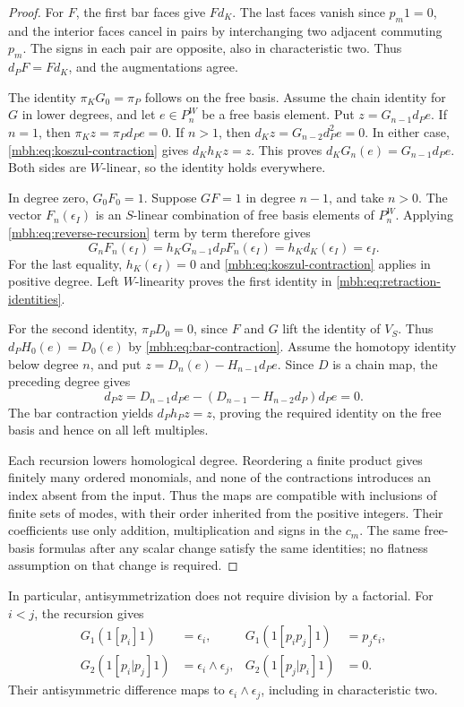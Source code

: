\begin{proof}
For \(F\), the first bar faces give \(Fd_K\).
The last faces vanish since \(p_m1=0\), and the interior faces
cancel in pairs by interchanging two adjacent commuting \(p_m\).
The signs in each pair are opposite, also in characteristic two.
Thus \(d_PF=Fd_K\), and the augmentations agree.

The identity \(\pi_KG_0=\pi_P\) follows on the free basis.
Assume the chain identity for \(G\) in lower degrees, and let
\(e\in P^W_n\) be a free basis element.  Put
\(z=G_{n-1}d_Pe\).  If \(n=1\), then
\(\pi_Kz=\pi_Pd_Pe=0\).  If \(n>1\), then
\(d_Kz=G_{n-2}d_P^2e=0\).  In either case,
\eqref{mbh:eq:koszul-contraction} gives \(d_Kh_Kz=z\).
This proves \(d_KG_n(e)=G_{n-1}d_Pe\).
Both sides are \(W\)-linear, so the identity holds everywhere.

In degree zero, \(G_0F_0=1\).  Suppose \(GF=1\) in degree
\(n-1\), and take \(n>0\).
The vector \(F_n(\epsilon_I)\) is an \(S\)-linear combination
of free basis elements of \(P^W_n\).  Applying
\eqref{mbh:eq:reverse-recursion} term by term therefore gives
\[
 G_nF_n(\epsilon_I)
   =h_KG_{n-1}d_PF_n(\epsilon_I)
   =h_Kd_K(\epsilon_I)=\epsilon_I.
\]
For the last equality, \(h_K(\epsilon_I)=0\) and
\eqref{mbh:eq:koszul-contraction} applies in positive degree.
Left \(W\)-linearity proves the first identity in
\eqref{mbh:eq:retraction-identities}.

For the second identity, \(\pi_PD_0=0\), since \(F\) and \(G\)
lift the identity of \(V_S\).  Thus
\(d_PH_0(e)=D_0(e)\) by \eqref{mbh:eq:bar-contraction}.
Assume the homotopy identity below degree \(n\), and put
\(z=D_n(e)-H_{n-1}d_Pe\).
Since \(D\) is a chain map, the preceding degree gives
\[
 d_Pz
  =D_{n-1}d_Pe
    -(D_{n-1}-H_{n-2}d_P)d_Pe=0.
\]
The bar contraction yields \(d_Ph_Pz=z\), proving the required
identity on the free basis and hence on all left multiples.

Each recursion lowers homological degree.  Reordering a finite
product gives finitely many ordered monomials, and none of the
contractions introduces an index absent from the input.  Thus the
maps are compatible with inclusions of finite sets of modes, with
their order inherited from the positive integers.
Their coefficients use only addition, multiplication and signs in
the \(c_m\).  The same free-basis formulas after any scalar change
satisfy the same identities; no flatness assumption on that change
is required.
\end{proof}

In particular, antisymmetrization does not require division by a
factorial.  For \(i<j\), the recursion gives
\[
 \begin{aligned}
 G_1(1[p_i]1)&=\epsilon_i,&
 G_1(1[p_ip_j]1)&=p_j\epsilon_i,\\
 G_2(1[p_i|p_j]1)&=\epsilon_i\wedge\epsilon_j,&
 G_2(1[p_j|p_i]1)&=0.
 \end{aligned}
\]
Their antisymmetric difference maps to
\(\epsilon_i\wedge\epsilon_j\), including in characteristic two.

